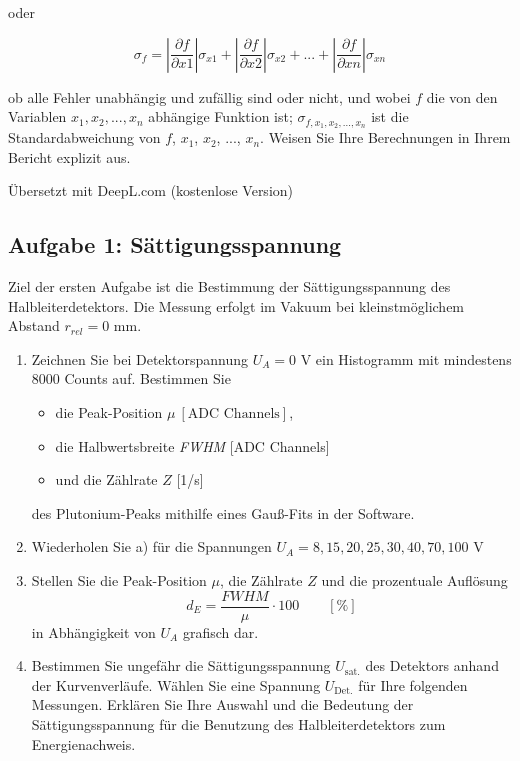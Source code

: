 oder 

\begin{equation}\label{eq:abs}
		\sigma_{f} = \left| \frac{\partial f}{\partial x1}\right| \sigma_{x1} + \left| \frac{\partial f}{\partial x2}\right| \sigma_{x2} + ... + \left| \frac{\partial f}{\partial xn}\right| \sigma_{xn}
\end{equation}

ob alle Fehler unabhängig und zufällig sind oder nicht, und wobei $f$ die von den Variablen $x_1, x_2, ..., x_n$ abhängige Funktion ist; $\sigma_{f, x_1, x_2,..., x_n}$ ist die Standardabweichung von $f$, $x_1$, $x_2$, ..., $x_n$. Weisen Sie Ihre Berechnungen in Ihrem Bericht explizit aus.
%

Übersetzt mit DeepL.com (kostenlose Version)

\subsection{Aufgabe 1: Sättigungsspannung}
Ziel der ersten Aufgabe ist die Bestimmung der Sättigungsspannung des Halbleiterdetektors. Die Messung erfolgt im Vakuum bei kleinstmöglichem Abstand $r_{rel} = 0$ mm.
\begin{enumerate}[label=\textbf{\alph*)}]
	\item Zeichnen Sie bei Detektorspannung $U_A = 0$ V ein Histogramm mit mindestens 8000 Counts auf. Bestimmen Sie 
		\begin{itemize}[nosep]
		\item die Peak-Position $\mu\ [\text{ADC Channels}]$,
		\item die Halbwertsbreite \textit{FWHM} [ADC Channels]
		\item und die Zählrate $Z$ [1/s]
	\end{itemize}
	des Plutonium-Peaks mithilfe eines Gauß-Fits in der Software.
	\item Wiederholen Sie a) für die Spannungen $U_A = 8, 15, 20, 25, 30, 40, 70, 100$ V
	\item Stellen Sie die Peak-Position $\mu$, die Zählrate $Z$ und die prozentuale Auflösung
		\begin{equation}
			d_E = \frac{\textit{FWHM}}{\mu} \cdot 100 \qquad [\%]
		\end{equation}
		in Abhängigkeit von $U_A$ grafisch dar.
	\item Bestimmen Sie ungefähr die Sättigungsspannung $U_{\text{sat.}}$ des Detektors anhand der Kurvenverläufe. Wählen Sie eine Spannung $U_{\text{Det.}}$ für Ihre folgenden Messungen. Erklären Sie Ihre Auswahl und die Bedeutung der Sättigungsspannung für die Benutzung des Halbleiterdetektors zum Energienachweis.
\end{enumerate}

